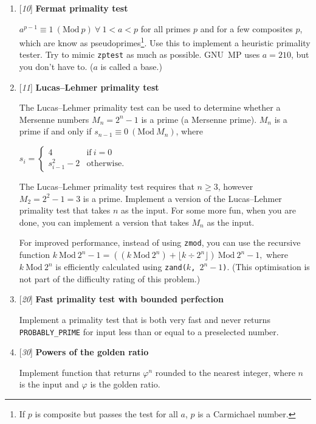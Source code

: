 \begin{enumerate}[label=\textbf{\arabic*}.]
\item {[\textit{10}]} \textbf{Fermat primality test}

$a^{p - 1} \equiv 1 ~(\text{Mod}~p) ~\forall~ 1 < a < p$
for all primes $p$ and for a few composites $p$,
which are know as pseudoprimes\footnote{If $p$ is composite
but passes the test for all $a$, $p$ is a Carmichael
number.}. Use this to implement a heuristic primality
tester. Try to mimic \texttt{zptest} as much as possible.
GNU~MP uses $a = 210$, but you don't have to. ($a$ is
called a base.)



\item {[\textit{11}]} \textbf{Lucas–Lehmer primality test}

The Lucas–Lehmer primality test can be used to determine
whether a Mersenne numbers $M_n = 2^n - 1$ is a prime (a
Mersenne prime). $M_n$ is a prime if and only if
$s_{n - 1} \equiv 0 ~(\text{Mod}~M_n)$, where

\( \displaystyle{
    s_i = \left \{ \begin{array}{ll}
      4 & \text{if} ~ i = 0 \\
      s_{i - 1}^2 - 2 & \text{otherwise}.
    \end{array} \right .
}\)

\noindent
The Lucas–Lehmer primality test requires that $n \ge 3$,
however $M_2 = 2^2 - 1 = 3$ is a prime. Implement a version
of the Lucas–Lehmer primality test that takes $n$ as the
input. For some more fun, when you are done, you can
implement a version that takes $M_n$ as the input.

For improved performance, instead of using \texttt{zmod},
you can use the recursive function
%
\( \displaystyle{
    k ~\mbox{Mod}~ 2^n - 1 =
    \left (
      (k ~\mbox{Mod}~ 2^n) + \lfloor k \div 2^n \rfloor
    \right ) ~\mbox{Mod}~ 2^n - 1,
}\)
%
where $k ~\mbox{Mod}~ 2^n$ is efficiently calculated
using \texttt{zand($k$, $2^n - 1$)}. (This optimisation
is not part of the difficulty rating of this problem.)



\item {[\textit{20}]} \textbf{Fast primality test with bounded perfection}

Implement a primality test that is both very fast and
never returns \texttt{PROBABLY\_PRIME} for input less
than or equal to a preselected number.



\item {[\textit{30}]} \textbf{Powers of the golden ratio}

Implement function that returns $\varphi^n$ rounded
to the nearest integer, where $n$ is the input and
$\varphi$ is the golden ratio.



\end{enumerate}



